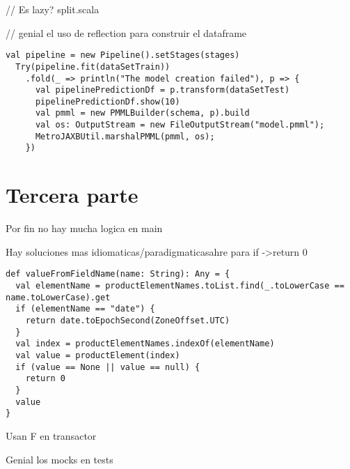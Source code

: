 \documentclass[a4paper]{article}
\begin{document}
// Es lazy? split.scala

// genial el uso de reflection para construir el dataframe

\begin{lstlisting}[style=scala]
  val pipeline = new Pipeline().setStages(stages)
  Try(pipeline.fit(dataSetTrain))
    .fold(_ => println("The model creation failed"), p => {
      val pipelinePredictionDf = p.transform(dataSetTest)
      pipelinePredictionDf.show(10)
      val pmml = new PMMLBuilder(schema, p).build
      val os: OutputStream = new FileOutputStream("model.pmml");
      MetroJAXBUtil.marshalPMML(pmml, os);
    })
\end{lstlisting}

\section{Tercera parte}

Por fin no hay mucha logica en main

Hay soluciones mas idiomaticas/paradigmaticasahre para if ->return 0

\begin{lstlisting}[style=scala]
def valueFromFieldName(name: String): Any = {
  val elementName = productElementNames.toList.find(_.toLowerCase == name.toLowerCase).get
  if (elementName == "date") {
    return date.toEpochSecond(ZoneOffset.UTC)
  }
  val index = productElementNames.indexOf(elementName)
  val value = productElement(index)
  if (value == None || value == null) {
    return 0
  }
  value
}
\end{lstlisting}


Usan F en transactor

Genial los mocks en tests
\end{document}
